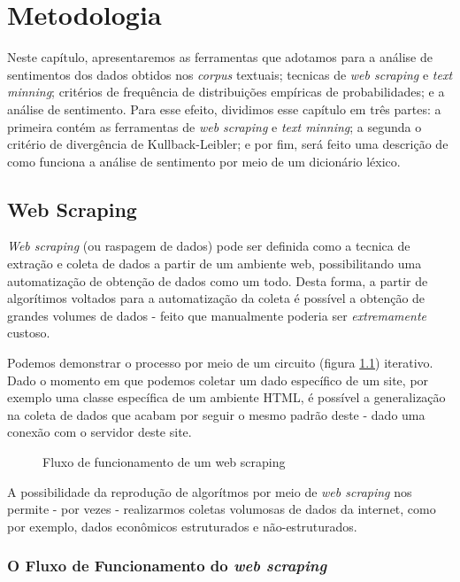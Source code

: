 \chapter{Metodologia} \label{metodologia}

Neste capítulo, apresentaremos as ferramentas que adotamos para a análise de sentimentos dos dados obtidos nos \textit{corpus} textuais; tecnicas de \textit{web scraping} e \textit{text minning}; critérios de frequência de distribuições empíricas de probabilidades; e a análise de sentimento. Para esse efeito, dividimos esse capítulo em três partes: a primeira contém as ferramentas de \textit{web scraping} e \textit{text minning}; a segunda o critério de divergência de Kullback-Leibler; e por fim, será feito uma descrição de como funciona a análise de sentimento por meio de um dicionário léxico. 

\section{Web Scraping}

\textit{Web scraping} (ou raspagem de dados) pode ser definida como a tecnica de extração e coleta de dados a partir de um ambiente web, possibilitando uma automatização de obtenção de dados como um todo. Desta forma, a partir de algorítimos voltados para a automatização da coleta é possível a obtenção de grandes volumes de dados - feito que manualmente poderia ser \textit{extremamente} custoso.

Podemos demonstrar o processo por meio de um circuito (figura \ref{fig:webscraping}) iterativo. Dado o momento em que podemos coletar um dado específico de um site, por exemplo uma classe específica de um ambiente HTML, é possível a generalização na coleta de dados que acabam por seguir o mesmo padrão deste - dado uma conexão com o servidor deste site.  

\begin{figure}[!h]
    \centering
    
    \caption{Fluxo de funcionamento de um web scraping}
    \label{fig:webscraping}
\end{figure}

A possibilidade da reprodução de algorítmos por meio de \textit{web scraping} nos permite - por vezes - realizarmos coletas volumosas de dados da internet, como por exemplo, dados econômicos estruturados e não-estruturados. 

\subsection{O Fluxo de Funcionamento do \textit{web scraping}}

